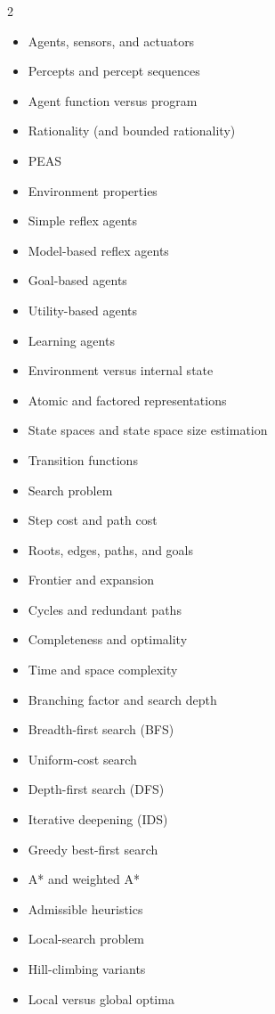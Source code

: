 \documentclass{report}
\begin{document}
\begin{multicols}{2}
\small
\begin{itemize}[nosep,leftmargin=*]
    \item Agents, sensors, and actuators
    \item Percepts and percept sequences
    \item Agent function versus program
    \item Rationality (and bounded rationality)
    \item PEAS
    \item Environment properties
    \item Simple reflex agents
    \item Model-based reflex agents
    \item Goal-based agents
    \item Utility-based agents
    \item Learning agents
    \item Environment versus internal state
    \item Atomic and factored representations
    \item State spaces and state space size estimation
    \item Transition functions
    \item Search problem
    \item Step cost and path cost
    \item Roots, edges, paths, and goals
    \item Frontier and expansion
    \item Cycles and redundant paths
    \item Completeness and optimality
    \item Time and space complexity
    \item Branching factor and search depth
    \item Breadth-first search (BFS)
    \item Uniform-cost search
    \item Depth-first search (DFS)
    \item Iterative deepening (IDS)
    \item Greedy best-first search
    \item A* and weighted A*
    \item Admissible heuristics
    \item Local-search problem
    \item Hill-climbing variants
    \item Local versus global optima

\end{itemize}
\end{multicols}
\end{document}
